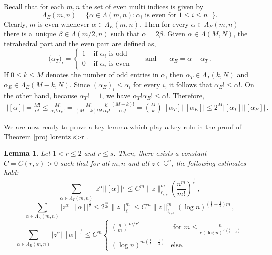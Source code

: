 \documentclass[12pt]{amsart}
\numberwithin{subsection}{section}
\newtheorem{lemma}[theorem]{Lemma}
\theoremstyle{definition}
\theoremstyle{remark}
\begin{document}
Recall that for each $m,n$ the set of even multi indices is given by
\[
\Lambda_E(m,n) = \big\lbrace \alpha \in \Lambda(m,n) :  \alpha_i \text{ is even for $1 \le i \le n$ }  \big\rbrace.
\]
Clearly, $m$ is even whenever $\alpha \in \Lambda_E(m,n)$. Then for every $\alpha \in \Lambda_E(m,n)$ there is a~unique
$\beta \in \Lambda(m/2,n)$ such that $\alpha = 2 \beta$. Given $\alpha \in \Lambda (M,N)$, the tetrahedral part and the even part are
defined as,
\[
\big(\alpha_{T} \big)_{i} = \begin{cases}
1 & \text{ if } \alpha_{i} \text{ is odd} \\
0 & \text{ if } \alpha_{i} \text{ is even}
\end{cases}
\quad\,\,\, \text{ and } \quad\,\,\, \alpha_E=\alpha-\alpha_T\,.
\]
If $0 \leq k \leq M$ denotes the number of odd entries in  $\alpha$, then $\alpha_{T} \in \Lambda_T(k,N)$  and $\alpha_E \in \Lambda_E(M-k,N)$.
Since $(\alpha_E)_i \le \alpha_i$ for every $i$, it follows that $\alpha_E! \le \alpha!$. On the other hand, because $\alpha_T! = 1$,
we have $\alpha_T! \alpha_E! \le \alpha!$. Therefore,
\begin{align}\label{eq: cardinality decomposition even-tetra}
|[\alpha]| = \frac{M!}{\alpha!} \le \frac{M!}{\alpha_T! \alpha_E!} = \frac{M!}{(M-k)! k!} \frac{k!}{\alpha_T!} \frac{(M-k)!}{\alpha_E!}
=  \binom{M}{k} |[\alpha_T]||[\alpha_E]| \le 2^M |[\alpha_T]||[\alpha_E]|\,.
\end{align}

\smallskip

We are now ready to prove a key lemma which play a key role in the proof of Theorem \ref{proj lorentz s>r}.


\begin{lemma} \label{3 cases}
Let $1<r\leq 2$ and $r\leq s$. Then, there exists a constant $C=C(r,s)>0$ such that for all $m,n$ and all $z \in \mathbb{C}^n$,  the following estimates hold{\rm:}
\begin{equation} \label{estimate1}
\sum_{\alpha \in \Lambda_T(m,n)} |z^\alpha| |[\alpha]|^{\frac{1}{r}}  \le C^m  \| z \|_{\ell_{r,s}}^m \left(\frac{n^m}{m!}\right)^{\frac{1}{r'}}\,,
\end{equation}
\begin{equation} \label{estimate2}
\sum_{\alpha \in \Lambda_E(m,n)} |z^\alpha| |[\alpha]|^{\frac{1}{r}}
\le 2^{\frac{m}{2r}}\| z \|_{\ell_r}^m  \le C^m  \| z \|_{\ell_{r,s}}^m (\log n)^{(\frac{1}{r}-\frac{1}{s})m}\,,
\end{equation}
\begin{equation} \label{estimate3}
\sum_{\alpha \in \Lambda_E(m,n)} |z^\alpha| |[\alpha]|^{\frac{1}{r}}
\le C^m 
\begin{cases}
\left(\frac{n}{m}\right)^{m/r'} & \text{ for } m \le \frac{n}{e(\log n)^{r'(\frac1{r}-\frac1{s})}} \\
(\log n)^{m(\frac1{r}-\frac1{s})}  & \text{else.}
\end{cases}
\end{equation}
\end{lemma}
\end{document}
